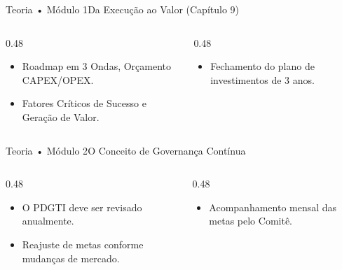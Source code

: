 \begin{senaiframe}{Teoria • Módulo 1}{Da Execução ao Valor (Capítulo 9)}
  \begin{columns}[t]
    \begin{column}{0.48\textwidth}
      \begin{tcolorbox}[senaigreencard, title={Capítulo 9: Quando e Quanto}]
        \begin{itemize}
          \item Roadmap em 3 Ondas, Orçamento CAPEX/OPEX.
          \item Fatores Críticos de Sucesso e Geração de Valor.
        \end{itemize}
      \end{tcolorbox}
    \end{column}
    \begin{column}{0.48\textwidth}
      \begin{tcolorbox}[senaicard, title={Síntese Final}]
        \begin{itemize}
          \item Fechamento do plano de investimentos de 3 anos.
        \end{itemize}
      \end{tcolorbox}
    \end{column}
  \end{columns}
\end{senaiframe}

\begin{senaiframe}{Teoria • Módulo 2}{O Conceito de Governança Contínua}
  \begin{columns}[t]
    \begin{column}{0.48\textwidth}
      \begin{tcolorbox}[senaibluecard, title={Instrumento Vivo}]
        \begin{itemize}
          \item O PDGTI deve ser revisado anualmente.
          \item Reajuste de metas conforme mudanças de mercado.
        \end{itemize}
      \end{tcolorbox}
    \end{column}
    \begin{column}{0.48\textwidth}
      \begin{tcolorbox}[senaicard, title={Evitar o Engavetamento}]
        \begin{itemize}
          \item Acompanhamento mensal das metas pelo Comitê.
        \end{itemize}
      \end{tcolorbox}
    \end{column}
  \end{columns}
\end{senaiframe}

